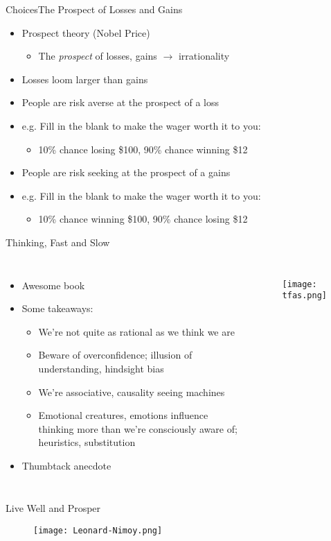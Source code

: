 \documentclass{beamer}
\begin{document}
\begin{frame}{Choices}{The Prospect of Losses and Gains}

  \begin{itemize}
  \addtolength{\itemsep}{0.5\baselineskip}
  \item Prospect theory (Nobel Price) 
        \begin{itemize}
        \item The {\it prospect} of losses, gains $\rightarrow$ irrationality
        \end{itemize}
  \item Losses loom larger than gains
  \item People are risk averse at the prospect of a loss
  \item e.g. Fill in the blank to make the wager worth it to you:
        \begin{itemize}
        \item 10\% chance losing \$100, 90\% chance winning \$12
        \end{itemize}
  \item People are risk seeking at the prospect of a gains
  \item e.g. Fill in the blank to make the wager worth it to you:
        \begin{itemize}
        \item 10\% chance winning \$100, 90\% chance losing \$12
        \end{itemize}
  \end{itemize}

\end{frame}


\begin{frame}{Thinking, Fast and Slow}{}
\begin{columns}
\begin{itemize}
\addtolength{\itemsep}{0.5\baselineskip}
\item Awesome book
\item Some takeaways: 
  \begin{itemize}
  \addtolength{\itemsep}{0.5\baselineskip}
  \item We're not quite as rational as we think we are
  \item Beware of overconfidence; illusion of understanding, hindsight bias 
  \item We're associative, causality seeing machines
  \item Emotional creatures, emotions influence thinking more than we're consciously aware of; heuristics, substitution 
  \end{itemize}
  \item Thumbtack anecdote
\end{itemize}
    \begin{figure}[H]
  	\centering
  	\texttt{[image: tfas.png]}
  	\end{figure}
\end{columns}
\end{frame}

\begin{frame}{Live Well and Prosper}{}
    \begin{figure}[H]
  	\centering
  	\texttt{[image: Leonard-Nimoy.png]}
  	\end{figure}
\end{frame}
\end{document}
